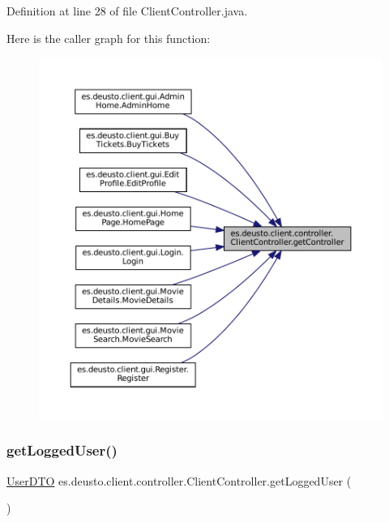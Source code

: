 Definition at line 28 of file Client\+Controller.\+java.

Here is the caller graph for this function\+:
\nopagebreak
\begin{figure}[H]
\begin{center}
\leavevmode
\includegraphics[width=350pt]{classes_1_1deusto_1_1client_1_1controller_1_1_client_controller_aa76786bb097da98592adb6aeefa8d996_icgraph}
\end{center}
\end{figure}
\mbox{\label{classes_1_1deusto_1_1client_1_1controller_1_1_client_controller_ac9d06db0017e2f06d06e8669398118f4}} 
\subsubsection{\texorpdfstring{getLoggedUser()}{getLoggedUser()}}
{\footnotesize\ttfamily \mbox{\hyperlink{classes_1_1deusto_1_1server_1_1data_1_1_user_d_t_o}{User\+D\+TO}} es.\+deusto.\+client.\+controller.\+Client\+Controller.\+get\+Logged\+User (\begin{DoxyParamCaption}{ }\end{DoxyParamCaption})}



